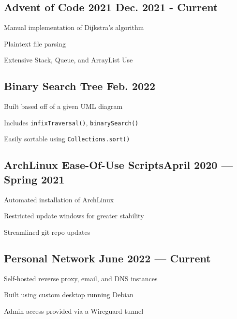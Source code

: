 \documentclass[letter,10pt]{article}
\begin{document}
\subsection{{Advent of Code 2021 \hfill Dec. 2021 - Current}}
\begin{zitemize}
	\item Manual implementation of Dijkstra's algorithm
	\item Plaintext file parsing
	\item Extensive Stack, Queue, and ArrayList Use
\end{zitemize}

\subsection{{Binary Search Tree \hfill Feb. 2022}}
\begin{zitemize}
	\item Built based off of a given UML diagram
	\item Includes \verb|infixTraversal()|, \verb|binarySearch()|
	\item Easily sortable using \verb|Collections.sort()|
\end{zitemize}

\subsection{{ArchLinux Ease-Of-Use Scripts\hfill April 2020 --- Spring 2021}}
\begin{zitemize}
	\item Automated installation of ArchLinux
	\item Restricted update windows for greater stability
	\item Streamlined git repo updates
\end{zitemize}

\subsection{{Personal Network \hfill June 2022 --- Current}}
\begin{zitemize}
	\item Self-hosted reverse proxy, email, and DNS instances
	\item Built using custom desktop running Debian
	\item Admin access provided via a Wireguard tunnel
\end{zitemize}
\end{document}
